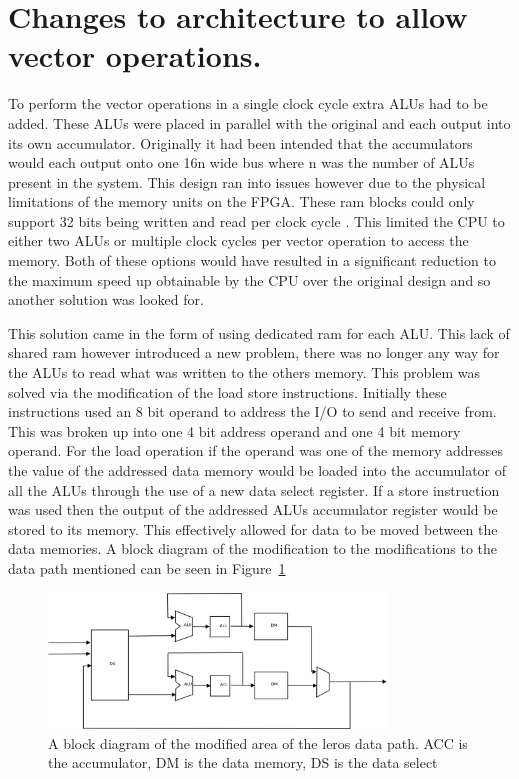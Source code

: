 \section{Changes to architecture to allow vector operations.}

To perform the vector operations in a single clock cycle extra ALUs had to be added. These ALUs were placed in parallel with the original and each output into its own accumulator. Originally it had been intended that the accumulators would each output onto one 16n wide bus where n was the number of ALUs present in the system. This design ran into issues however due to the physical limitations of the memory units on the FPGA. These ram blocks could only support 32 bits being written and read per clock cycle \cite{spartan_ram}. This limited the CPU to either two ALUs or multiple clock cycles per vector operation to access the memory. Both of these options would have resulted in a significant reduction to the maximum speed up obtainable by the CPU over the original design and so another solution was looked for.

This solution came in the form of using dedicated ram for each ALU. This lack of shared ram however introduced a new problem, there was no longer any way for the ALUs to read what was written to the others memory. This problem was solved via the modification of the load store instructions. Initially these instructions used an 8 bit operand to address the I/O to send and receive from. This was broken up into one 4 bit address operand and one 4 bit memory operand. For the load operation if the operand was one of the memory addresses the value of the addressed data memory would be loaded into the accumulator of all the ALUs through the use of a new data select register. If a store instruction was used then the output of the addressed ALUs accumulator register would be stored to its memory. This effectively allowed for data to be moved between the data memories. A block diagram of the modification to the modifications to the data path mentioned can be seen in Figure~\ref{new_path}

\begin{figure}[ht]
	\begin{center}
		\includegraphics[width=0.8\textwidth]{images/new_path}
	\end{center}
	\caption{A block diagram of the modified area of the leros data path. ACC is the accumulator, DM is the data memory, DS is the data select}
	\label{new_path}
\end{figure}


